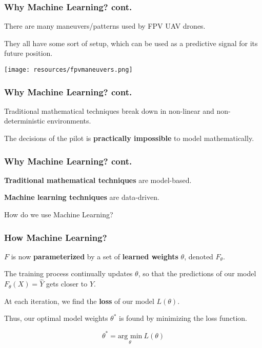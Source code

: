 \documentclass{beamer}
\begin{document}
\begin{frame}
    \frametitle{Why Machine Learning? cont.}

    There are \alert{many} maneuvers/patterns used by FPV UAV drones.

    They all have some sort of \alert{setup}, which can be used as a predictive
    signal for its future position.
    
    \centering
    \texttt{[image: resources/fpvmaneuvers.png]}
\end{frame}

\begin{frame}
    \frametitle{Why Machine Learning? cont.}

    Traditional mathematical techniques break down in non-linear and 
    non-deterministic environments.

    The decisions of the pilot is \textbf{practically impossible} to model 
    mathematically.
\end{frame}

\begin{frame}
    \frametitle{Why Machine Learning? cont.}

    \textbf{Traditional mathematical techniques} are \alert{model-based}.

    \textbf{Machine learning techniques} are \alert{data-driven}.
\end{frame}

\begin{frame}[standout]
    How do we use Machine Learning?
\end{frame}

\begin{frame}
    \frametitle{How Machine Learning?}

    $F$ is now \textbf{parameterized} by a set of \textbf{learned weights}
    $\theta$, denoted $F_\theta$.

    The training process continually updates $\theta$, so that the predictions 
    of our model $F_\theta(X) = \hat{Y}$ gets closer to $Y$.

    At each iteration, we find the \textbf{loss} of our model $L(\theta)$.

    Thus, our \alert{optimal} model weights $\theta^*$ is found by minimizing
    the loss function.
    
    $$ \theta^* = \underset{\theta}{\text{arg min}}\  L(\theta)$$

\end{frame}
\end{document}
